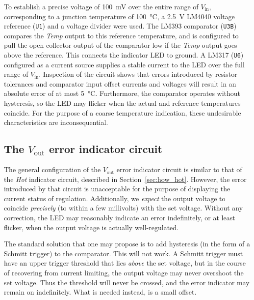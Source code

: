 \documentclass[letterpaper,twocolumn,11pt]{article}
\newcommand{\refdes}[1]{\texttt{#1}}
\begin{document}
To establish a precise voltage of \SI{100}{\mV} over the entire range of
$V_\text{in}$, corresponding to a junction temperature of \SI{100}{\celsius}, a
\SI{2.5}{\V} LM4040 voltage reference (\refdes{U1}) and a voltage divider were
used. The LM393 comparator (\refdes{U3B}) compares the \textit{Temp} output to
this reference temperature, and is configured to pull the open collector output
of the comparator low if the \textit{Temp} output goes above the reference. This
connects the indicator LED to ground. A LM317 (\refdes{U6}) configured as a
current source supplies a stable current to the LED over the full range of
$V_\text{in}$. Inspection of the circuit shows that errors introduced by
resistor tolerances and comparator input offset currents and voltages will
result in an absolute error of at most \SI{5}{\celsius}. Furthermore, the
comparator operates without hysteresis, so the LED may flicker when the
actual and reference temperatures coincide. For the purpose of a coarse
temperature indication, these undesirable characteristics are inconsequential.

\subsection{The $V_\text{out}$ error indicator circuit}\label{sec:how_offset}

The general configuration of the $V_\text{out}$ error indicator circuit is
similar to that of the \textit{Hot} indicator circuit, described in
Section~\ref{sec:how_hot}. However, the error introduced by that circuit is
unacceptable for the purpose of displaying the current status of regulation.
Additionally, we \emph{expect} the output voltage to coincide \emph{precisely}
(to within a few millivolts) with the set voltage. Without any correction, the
LED may reasonably indicate an error indefinitely, or at least flicker, when the
output voltage is actually well-regulated.

The standard solution that one may propose is to add hysteresis (in the form of
a Schmitt trigger) to the comparator. This will not work. A Schmitt trigger must
have an upper trigger threshold that lies \emph{above} the set voltage, but in
the course of recovering from current limiting, the output voltage may never
overshoot the set voltage. Thus the threshold will never be crossed, and the
error indicator may remain on indefinitely. What is needed instead, is a small
offset.
\end{document}

